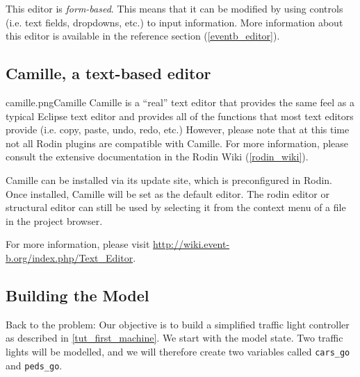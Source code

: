 This editor is \textit{form-based}.  This means that it can be modified by using controls (i.e. text fields, dropdowns, etc.) to input information. More information about this editor is available in the reference section (\ref{eventb_editor}).


\subsection{Camille, a text-based editor}
\label{tut_camille}

\begin{rodin-plugin}{camille.png}{Camille}
Camille is a ``real'' text editor that provides the same feel as a typical Eclipse text editor and provides all of the functions that most text editors provide (i.e. copy, paste, undo, redo, etc.)  However, please note that at this time not all Rodin plugins are compatible with Camille.  For more information, please consult the extensive documentation in the Rodin Wiki (\ref{rodin_wiki}).

Camille can be installed via its update site, which is preconfigured in Rodin.  Once installed, Camille will be set as the default editor.  The rodin editor or structural editor can still be used by selecting it from the context menu of a file in the project browser.

For more information, please visit \url{http://wiki.event-b.org/index.php/Text_Editor}.


\end{rodin-plugin}

\subsection{Building the Model}
\label{tut_building_the_model}

Back to the problem: Our objective is to build a simplified traffic light controller as described in \ref{tut_first_machine}.  We start with the model state.  Two traffic lights will be modelled, and we will therefore create two variables called  \texttt{cars\_go} and \texttt{peds\_go}.  

